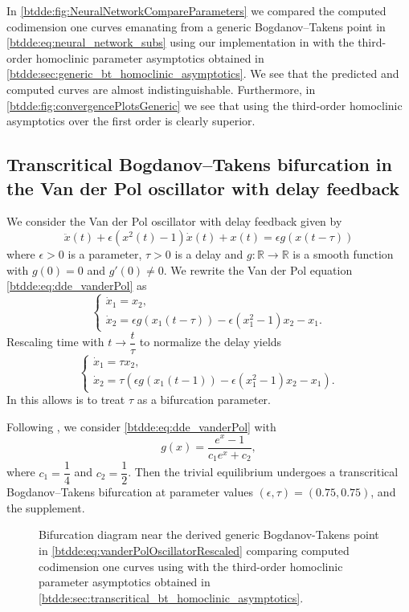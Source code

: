In \cref{btdde:fig:NeuralNetworkCompareParameters} we compared the computed
codimension one curves emanating from a generic Bogdanov--Takens point in
\cref{btdde:eq:neural_network_subs} using our implementation in \DDEBIFTOOL with the
third-order homoclinic parameter asymptotics obtained in
\cref{btdde:sec:generic_bt_homoclinic_asymptotics}. We see that the predicted and
computed curves are almost indistinguishable. Furthermore, in
\cref{btdde:fig:convergencePlotsGeneric} we see that using the third-order homoclinic
asymptotics over the first order is clearly superior.

\subsection{Transcritical Bogdanov--Takens bifurcation in the Van der Pol oscillator with delay feedback}
We consider the Van der Pol oscillator with delay feedback \cite{jiang2007bogdanov}
given by 
\begin{equation}
\ddot{x}(t) + \epsilon(x^2(t)-1)\dot{x}(t) + x(t) = \epsilon g(x(t-\tau))\label{btdde:eq:dde_vanderPol}
\end{equation}
where $\epsilon>0$ is a parameter, $\tau>0$ is a delay and $g:\mathbb{R}\rightarrow\mathbb{R}$
is a smooth function with $g(0) = 0$ and $g'(0)\neq0$. We rewrite
the Van der Pol equation \cref{btdde:eq:dde_vanderPol} as
\begin{equation}
\label{btdde:eq:vanderPolOscillator}
\begin{cases}
    \dot{x}_1 = x_2,\\
    \dot{x}_2 = \epsilon g(x_1(t-\tau))-\epsilon(x_1^2-1)x_2-x_1.
\end{cases}
\end{equation}
Rescaling time with $t\rightarrow\dfrac{t}{\tau}$ to normalize the
delay yields
\begin{equation}
\label{btdde:eq:vanderPolOscillatorRescaled}
\begin{cases}
\dot{x}_1 = \tau x_2,\\
\dot{x}_2 = \tau\left(\epsilon g(x_1(t-1))-\epsilon(x_1^2-1)x_2-x_1\right).
\end{cases}
\end{equation}
In this allows is to treat $\tau$ as a bifurcation parameter.

Following \cite{jiang2007bogdanov}, we consider \cref{btdde:eq:dde_vanderPol} with
\[
g(x) = \frac{e^x-1}{c_1e^x + c_2},
\]
where $c_1 = \dfrac{1}{4}$ and $c_2 = \dfrac{1}{2}$. Then the trivial
equilibrium undergoes a transcritical Bogdanov--Takens bifurcation at parameter
values $(\epsilon,\tau) = (0.75,0.75)$, \cite{jiang2007bogdanov} and the
supplement. 
%
\begin{figure}[ht]
    \centering
    \caption{Bifurcation diagram near the derived generic Bogdanov-Takens point in
        \cref{btdde:eq:vanderPolOscillatorRescaled} comparing computed codimension one curves using
        \DDEBIFTOOL with the third-order homoclinic parameter asymptotics obtained
        in \cref{btdde:sec:transcritical_bt_homoclinic_asymptotics}.}
    \label{btdde:fig:vanderPolOscillatorCompareParameters}
\end{figure}

